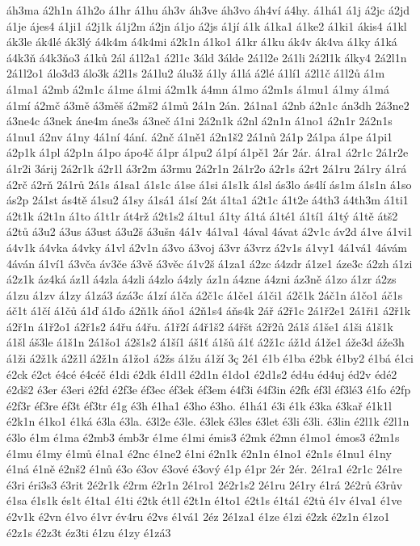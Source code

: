 {áh3ma
á2h1n
á1h2o
á1hr
á1hu
áh3v
áh3ve
áh3vo
áh4ví
á4hy.
á1há1
á1j
á2jc
á2jd
á1je
ájes4
á1ji1
á2j1k
á1j2m
á2jn
á1jo
á2js
á1jí
á1k
á1ka1
á1ke2
á1ki1
ákis4
á1kl
ák3le
ák4lé
ák3lý
á4k4m
á4k4mi
á2k1n
á1ko1
á1kr
á1ku
ák4v
ák4va
á1ky
á1ká
á4k3ň
á4k3ňo3
á1ků
2ál
á1l2a1
á2l1c
3áld
3álde
2á1l2e
2á1li
2á2l1k
álky4
2á2l1n
2á1l2o1
álo3d3
álo3k
á2l1s
2á1lu2
álu3ž
á1ly
á1lá
á2lé
á1lí1
á2l1č
á1l2ů
á1m
á1ma1
á2mb
á2m1c
á1me
á1mi
á2m1k
á4mn
á1mo
á2m1s
á1mu1
á1my
á1má
á1mí
á2mč
á3mě
á3měš
á2mš2
á1mů
2á1n
2án.
2á1na1
á2nb
á2n1c
án3dh
2á3ne2
á3ne4c
á3nek
áne4m
áne3s
á3neč
á1ni
2á2n1k
á2nl
á2n1n
á1no1
á2n1r
2á2n1s
á1nu1
á2nv
á1ny
4á1ní
4ání.
á2nč
á1ně1
á2n1š2
2á1nů
2á1p
2á1pa
á1pe
á1pi1
á2p1k
á1pl
á2p1n
á1po
ápo4č
á1pr
á1pu2
á1pí
á1pě1
2ár
2ár.
á1ra1
á2r1c
2á1r2e
á1r2i
3árij
2á2r1k
á2r1l
á3r2m
á3rmu
2á2r1n
2á1r2o
á2r1s
á2rt
2á1ru
2á1ry
á1rá
á2rč
á2rň
2á1rů
2á1s
á1sa1
á1s1c
á1se
á1si
á1s1k
á1sl
ás3lo
ás4lí
ás1m
á1s1n
á1so
ás2p
2á1st
ás4tě
á1su2
á1sy
á1sá1
á1sí
2át
á1ta1
á2t1c
á1t2e
á4th3
á4th3m
á1ti1
á2t1k
á2t1n
á1to
á1t1r
át4rž
á2t1s2
á1tu1
á1ty
á1tá
á1té1
á1tí1
á1tý
á1tě
átš2
á2tů
á3u2
á3us
á3ust
á3u2š
á3ušn
4á1v
4á1va1
4ával
4ávat
á2v1c
áv2d
á1ve
á1vi1
á4v1k
á4vka
á4vky
á1vl
á2v1n
á3vo
á3voj
á3vr
á3vrz
á2v1s
á1vy1
4á1vá1
4ávám
4áván
á1ví1
á3vča
áv3če
á3vě
á3věc
á1v2š
á1za1
á2zc
á4zdr
á1ze1
áze3c
á2zh
á1zi
á2z1k
áz4ká
áz1l
á4zla
á4zli
á4zlo
á4zly
áz1n
á4zne
á4zni
áz3ně
á1zo
á1zr
á2zs
á1zu
á1zv
á1zy
á1zá3
ázá3c
á1zí
á1ča
á2č1c
á1če1
á1či1
á2č1k
2áč1n
á1čo1
áč1s
áč1t
á1čí
á1čů
á1ď
á1ďo
á2ň1k
áňo1
á2ň1s4
áňs4k
2ář
á2ř1c
2á1ř2e1
2á1ři1
á2ř1k
á2ř1n
á1ř2o1
á2ř1s2
á4řu
á4řu.
á1ř2í
á4ř1š2
á4řšt
á2ř2ů
2á1š
á1še1
á1ši
á1š1k
á1šl
áš3le
á1š1n
2á1šo1
á2š1s2
á1ší1
áš1ť
á1šů
á1ť
á2ž1c
áž1d
á1že1
áže3d
áže3h
á1ži
á2ž1k
á2ž1l
á2ž1n
á1žo1
á2žs
á1žu
á1ží
3ç
2é1
é1b
é1ba
é2bk
é1by2
é1bá
é1ci
é2ck
é2ct
é4cé
é4céč
é1di
é2dk
é1d1l
é2d1n
é1do1
é2d1s2
éd4u
éd4uj
éd2v
édé2
é2dš2
é3er
é3eri
é2fd
é2f3e
éf3ec
éf3ek
éf3em
é4f3i
é4f3in
é2fk
éf3l
éf3lé3
é1fo
é2fp
é2f3r
éf3re
éf3t
éf3tr
é1g
é3h
é1ha1
é3ho
é3ho.
é1há1
é3i
é1k
é3ka
é3kař
é1k1l
é2k1n
é1ko1
é1ká
é3la
é3la.
é3l2e
é3le.
é3lek
é3les
é3let
é3li
é3li.
é3lin
é2l1k
é2l1n
é3lo
é1m
é1ma
é2mb3
émb3r
é1me
é1mi
émis3
é2mk
é2mn
é1mo1
émos3
é2m1s
é1mu
é1my
é1mů
é1na1
é2nc
é1ne2
é1ni
é2n1k
é2n1n
é1no1
é2n1s
é1nu1
é1ny
é1ná
é1ně
é2nš2
é1nů
é3o
é3ov
é3ové
é3ový
é1p
é1pr
2ér
2ér.
2é1ra1
é2r1c
2é1re
é3ri
éri3s3
é3rit
2é2r1k
é2rm
é2r1n
2é1ro1
2é2r1s2
2é1ru
2é1ry
é1rá
2é2rů
é3rův
é1sa
é1s1k
és1t
é1ta1
é1ti
é2tk
ét1l
é2t1n
é1to1
é2t1s
é1tá1
é2tů
é1v
é1va1
é1ve
é2v1k
é2vn
é1vo
é1vr
év4ru
é2vs
é1vá1
2éz
2é1za1
é1ze
é1zi
é2zk
é2z1n
é1zo1
é2z1s
é2z3t
éz3ti
é1zu
é1zy
é1zá3
}
